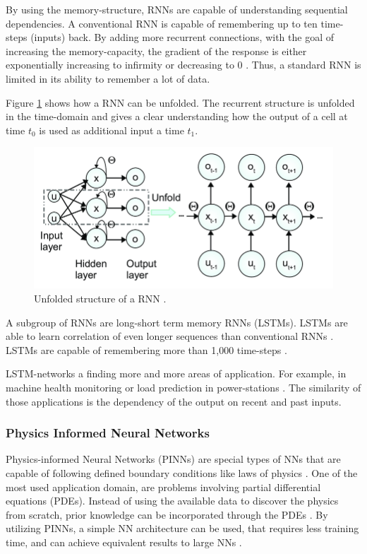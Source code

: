 By using the memory-structure, RNNs are capable of understanding sequential dependencies. A conventional RNN is capable of remembering up to ten time-steps (inputs) back. By adding more recurrent connections, with the goal of increasing the memory-capacity, the gradient of the response is either exponentially increasing to infirmity or decreasing to 0 \cite{Staudemeyer}. Thus, a standard RNN is limited in its ability to remember a lot of data.

Figure \ref{fig:rnn2} shows how a RNN can be unfolded. The recurrent structure is unfolded in the time-domain and gives a clear understanding how the output of a cell at time \(t_0\) is used as additional input a time \(t_1\).

\begin{figure}[H]
	\centering
	\includegraphics[width=0.8\linewidth]{IMGs/RNN2.png}
	\caption{Unfolded structure of a RNN \cite{Guo}.}
	\label{fig:rnn2}
\end{figure}


A subgroup of RNNs are long-short term memory RNNs (LSTMs). LSTMs are able to learn correlation of even longer sequences than conventional RNNs \cite{Salehinejad}. LSTMs are capable of remembering more than 1,000 time-steps \cite{Staudemeyer}.

LSTM-networks a finding more and more areas of application. For example, in machine health monitoring or load prediction in power-stations \cite{Zhao,Muzaffar}. The similarity of those applications is the dependency of the output on recent and past inputs. 

\subsubsection*{Physics Informed Neural Networks}
Physics-informed Neural Networks (PINNs) are special types of NNs that are capable of following defined boundary conditions like laws of physics \cite{Cai}. One of the most used application domain, are problems involving partial differential equations (PDEs). Instead of using the available data to discover the physics from scratch, prior knowledge can be incorporated through the PDEs \cite{Cuomo}. By utilizing PINNs, a simple NN architecture can be used, that requires less training time, and can achieve equivalent results to large NNs \cite{Misyris}.

